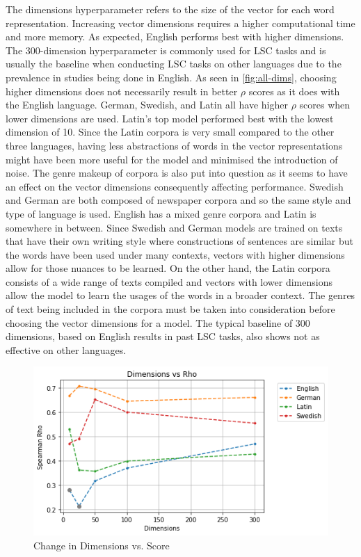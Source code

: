 The dimensions hyperparameter refers to the size of the vector for each word representation. Increasing vector dimensions requires a higher computational time and more memory. As expected, English performs best with higher dimensions. The 300-dimension hyperparameter is commonly used for LSC tasks and is usually the baseline when conducting LSC tasks on other languages due to the prevalence in studies being done in English. As seen in \autoref{fig:all-dims}, choosing higher dimensions does not necessarily result in better $\rho$ scores as it does with the English language. German, Swedish, and Latin all have higher $\rho$ scores when lower dimensions are used. Latin’s top model performed best with the lowest dimension of 10. Since the Latin corpora is very small compared to the other three languages, having less abstractions of words in the vector representations might have been more useful for the model and minimised the introduction of noise. The genre makeup of corpora is also put into question as it seems to have an effect on the vector dimensions consequently affecting performance. Swedish and German are both composed of newspaper corpora and so the same style and type of language is used. English has a mixed genre corpora and Latin is somewhere in between. Since Swedish and German models are trained on texts that have their own writing style where constructions of sentences are similar but the words have been used under many contexts, vectors with higher dimensions allow for those nuances to be learned. On the other hand, the Latin corpora consists of a wide range of texts compiled and vectors with lower dimensions allow the model to learn the usages of the words in a broader context. The genres of text being included in the corpora must be taken into consideration before choosing the vector dimensions for a model. The typical baseline of 300 dimensions, based on English results in past LSC tasks, also shows not as effective on other languages.

\begin{figure}[h]
  \centering
  \includegraphics[width=.8\linewidth]{sections/figures/dims_all.png}
  \caption{Change in Dimensions vs. Score}
  \label{fig:all-dims}
\end{figure}

